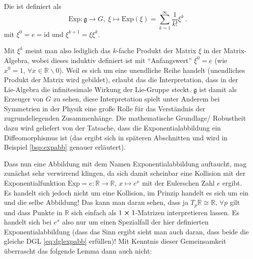 \documentclass[../H_Analysis_main.tex]{subfiles}
\begin{document}
\begin{defi}[Exponentialabbildung]\label{defi:defiexpabb}
Die  ist definiert als
\begin{equation}
\text{Exp}: \mathfrak{g} \rightarrow G, \; \xi \mapsto \text{Exp}(\xi) = \sum_{k = 1}^\infty \frac{1}{k!} \xi^k \, .
\end{equation}
mit $\xi^0 = e = \text{id}$ und $\xi^{k + 1} = \xi \xi^k$.
\end{defi}
Mit $\xi^k$ meint man also lediglich das $k$-fache Produkt der Matrix $\xi$ in der Matrix-Algebra, wobei dieses induktiv definiert ist mit \enquote{Anfangswert} $\xi^0 = e$ (wie $x^0 = 1, \, \forall x \in \mathbb{R} \backslash \qty{0}$). Weil es sich um eine unendliche Reihe handelt (unendliches Produkt der Matrix wird gebildet), erlaubt das die Interpretation, dass in der Lie-Algebra die infinitesimale Wirkung der Lie-Gruppe steckt. $\mathfrak{g}$ ist damit als Erzeuger von $G$ zu sehen, diese Interpretation spielt unter Anderem bei Symmetrien in der Physik eine große Rolle für das Verständnis der zugrundeliegenden Zusammenhänge. Die mathematische Grundlage/ Robustheit dazu wird geliefert von der Tatsache, dass die Exponentialabbildung ein Diffeomorphismus ist (das ergibt sich in späteren Abschnitten und wird in Beispiel \ref{bsp:expabb} genauer erläutert).


Dass nun eine Abbildung mit dem Namen Exponentialabbildung auftaucht, mag zunächst sehr verwirrend klingen, da sich damit scheinbar eine Kollision mit der Exponentialfunktion $\text{Exp} = e: \mathbb{R} \rightarrow \mathbb{R}, \, x \mapsto e^x$ mit der Eulerschen Zahl $e$ ergibt. Es handelt sich jedoch nicht um eine Kollision, im Prinzip handelt es sich um ein und die selbe Abbildung! Das kann man daran sehen, dass ja $T_p\mathbb{R} \cong \mathbb{R}, \, \forall p$ gilt und dass Punkte in $\mathbb{R}$ sich einfach als $1 \cross 1$-Matrizen interpretieren lassen. Es handelt sich bei $e^x$ also nur um einen Spezialfall der hier definierten Exponentialabbildung (dass das Sinn ergibt sieht man auch daran, dass beide die gleiche DGL \ref{eq:dglexpabb} erfüllen)! Mit Kenntnis dieser Gemeinsamkeit überrascht das folgende Lemma dann auch nicht:
\end{document}
